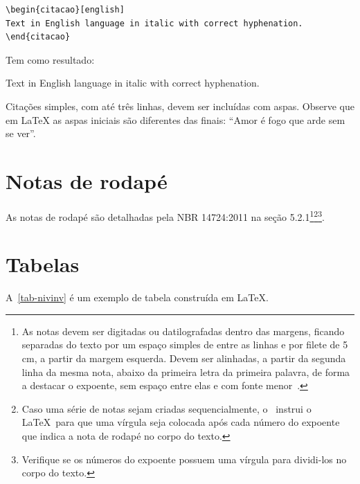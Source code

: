 \begin{verbatim}
\begin{citacao}[english]
Text in English language in italic with correct hyphenation.
\end{citacao}
\end{verbatim}

Tem como resultado:

\begin{citacao}[english]
Text in English language in italic with correct hyphenation.
\end{citacao}%
Citações simples, com até três linhas, devem ser
incluídas com aspas. Observe que em \LaTeX{} as aspas iniciais são diferentes das
finais: ``Amor é fogo que arde sem se ver''.

\section{Notas de rodapé}

As notas de rodapé são detalhadas pela NBR 14724:2011 na seção 5.2.1\footnote{As
notas devem ser digitadas ou datilografadas dentro das margens, ficando
separadas do texto por um espaço simples de entre as linhas e por filete de 5
cm, a partir da margem esquerda. Devem ser alinhadas, a partir da segunda linha
da mesma nota, abaixo da primeira letra da primeira palavra, de forma a destacar
o expoente, sem espaço entre elas e com fonte menor~.}\footnote{Caso uma série de notas sejam
  criadas sequencialmente, o \abnTeX\ instrui o \LaTeX\ para que uma vírgula seja
  colocada após cada número do expoente que indica a nota de rodapé no corpo do
  texto.}\footnote{Verifique se os números do expoente possuem uma vírgula para
  dividi-los no corpo do texto.}.


\section{Tabelas}%
A~\autoref{tab-nivinv} é um exemplo de tabela construída em
\LaTeX.


